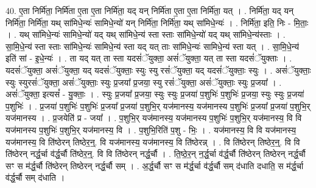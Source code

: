 \documentclass[17pt]{extarticle}
\begin{document}
40. ए॒ता निर्मि॑ता॒ निर्मि॑ता ए॒ता ए॒ता निर्मि॑ता॒ यद् यन् निर्मि॑ता ए॒ता ए॒ता निर्मि॑ता॒ यत् । . निर्मि॑ता॒ यद् यन् निर्मि॑ता॒ निर्मि॑ता॒ यथ् सा॑मिधे॒न्यः॑ सामिधे॒न्यो॑ यन् निर्मि॑ता॒ निर्मि॑ता॒ यथ् सा॑मिधे॒न्यः॑ । . निर्मि॑ता॒ इति॒ निः - मि॒ताः॒ । . यथ् सा॑मिधे॒न्यः॑ सामिधे॒न्यो॑ यद् यथ् सा॑मिधे॒न्य॑ स्ता स्ताः सा॑मिधे॒न्यो॑ यद् यथ् सा॑मिधे॒न्य॑स्ताः । . सा॒मि॒धे॒न्य॑ स्ता स्ताः सा॑मिधे॒न्यः॑ सामिधे॒न्य॑ स्ता यद् यत् ताः सा॑मिधे॒न्यः॑ सामिधे॒न्य॑ स्ता यत् । . सा॒मि॒धे॒न्य॑ इति॑ सां - इ॒धे॒न्यः॑ । . ता यद् यत् ता स्ता यदसं॑ॅयुक्ता॒ असं॑ॅयुक्ता॒ यत् ता स्ता यदसं॑ॅयुक्ताः । . यदसं॑ॅयुक्ता॒ असं॑ॅयुक्ता॒ यद् यदसं॑ॅयुक्ताः॒ स्युः स्यु रसं॑ॅयुक्ता॒ यद् यदसं॑ॅयुक्ताः॒ स्युः । . असं॑ॅयुक्ताः॒ स्युः स्युरसं॑ॅयुक्ता॒ असं॑ॅयुक्ताः॒ स्युः प्र॒जया᳚ प्र॒जया॒ स्यु रसं॑ॅयुक्ता॒ असं॑ॅयुक्ताः॒ स्युः प्र॒जया᳚ । . असं॑ॅयुक्ता॒ इत्यसं᳚ - यु॒क्ताः॒ । . स्युः प्र॒जया᳚ प्र॒जया॒ स्युः स्युः प्र॒जया॑ प॒शुभिः॑ प॒शुभिः॑ प्र॒जया॒ स्युः स्युः प्र॒जया॑ प॒शुभिः॑ । . प्र॒जया॑ प॒शुभिः॑ प॒शुभिः॑ प्र॒जया᳚ प्र॒जया॑ प॒शुभि॒र् यज॑मानस्य॒ यज॑मानस्य प॒शुभिः॑ प्र॒जया᳚ प्र॒जया॑ प॒शुभि॒र् यज॑मानस्य । . प्र॒जयेति॑ प्र - जया᳚ । . प॒शुभि॒र् यज॑मानस्य॒ यज॑मानस्य प॒शुभिः॑ प॒शुभि॒र् यज॑मानस्य॒ वि वि यज॑मानस्य प॒शुभिः॑ प॒शुभि॒र् यज॑मानस्य॒ वि । . प॒शुभि॒रिति॑ प॒शु - भिः॒ । . यज॑मानस्य॒ वि वि यज॑मानस्य॒ यज॑मानस्य॒ वि ति॑ष्ठेरन् तिष्ठेर॒न्॒. वि यज॑मानस्य॒ यज॑मानस्य॒ वि ति॑ष्ठेरन्न् । . वि ति॑ष्ठेरन् तिष्ठेर॒न्॒. वि वि ति॑ष्ठेरन् नर्द्ध॒र्चा व॑र्द्ध॒र्चौ ति॑ष्ठेर॒न्॒. वि वि ति॑ष्ठेरन् नर्द्ध॒र्चौ । . ति॒ष्ठे॒र॒न् न॒र्द्ध॒र्चा व॑र्द्ध॒र्चौ ति॑ष्ठेरन् तिष्ठेरन् नर्द्ध॒र्चौ सꣳ स म॑र्द्ध॒र्चौ ति॑ष्ठेरन् तिष्ठेरन् नर्द्ध॒र्चौ सम् । . अ॒र्द्ध॒र्चौ सꣳ स म॑र्द्ध॒र्चा व॑र्द्ध॒र्चौ सम् द॑धाति दधाति॒ स म॑र्द्ध॒र्चा व॑र्द्ध॒र्चौ सम् द॑धाति । \newline
\end{document}
